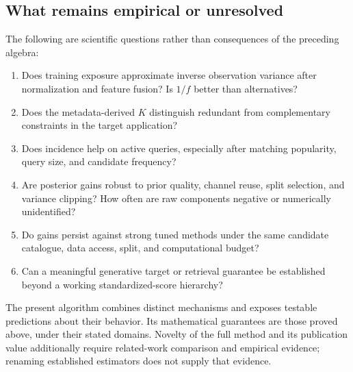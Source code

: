 \documentclass[11pt,a4paper]{article}
\theoremstyle{remark}
\begin{document}
\subsection{What remains empirical or unresolved}
The following are scientific questions rather than consequences of the
preceding algebra:
\begin{enumerate}
 \item Does training exposure approximate inverse observation variance
 after normalization and feature fusion? Is $1/f$ better than alternatives?
 \item Does the metadata-derived $K$ distinguish redundant from
 complementary constraints in the target application?
 \item Does incidence help on active queries, especially after matching
 popularity, query size, and candidate frequency?
 \item Are posterior gains robust to prior quality, channel reuse,
 split selection, and variance clipping? How often are raw components
 negative or numerically unidentified?
 \item Do gains persist against strong tuned methods under the same
 candidate catalogue, data access, split, and computational budget?
 \item Can a meaningful generative target or retrieval guarantee be
 established beyond a working standardized-score hierarchy?
\end{enumerate}
The present algorithm combines distinct mechanisms and exposes testable
predictions about their behavior. Its mathematical guarantees are those
proved above, under their stated domains. Novelty of the full method and
its publication value additionally require related-work comparison and
empirical evidence; renaming established estimators does not supply that
evidence.

\appendix
\end{document}
